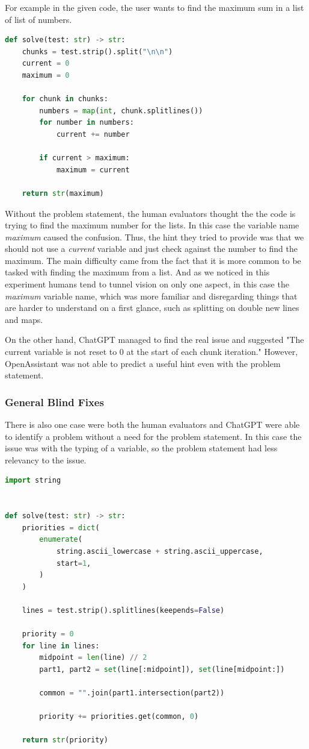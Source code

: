 \documentclass[12pt,a4paper]{report}
\begin{document}
For example in the given code, the user wants to find the maximum sum in a list of list of numbers.

\begin{lstlisting}[language=Python]
def solve(test: str) -> str:
    chunks = test.strip().split("\n\n")
    current = 0
    maximum = 0

    for chunk in chunks:
        numbers = map(int, chunk.splitlines())
        for number in numbers:
            current += number

        if current > maximum:
            maximum = current

    return str(maximum)
\end{lstlisting}

Without the problem statement, the human evaluators thought the the code is trying to find the maximum number for the lists. In this case the variable name \textit{maximum} caused the confusion. Thus, the hint they tried to provide was that we should not use a \textit{current} variable and just check against the number to find the maximum. The main difficulty came from the fact that it is more common to be tasked with finding the maximum from a list. And as we noticed in this experiment humans tend to tunnel vision on only one aspect, in this case the \textit{maximum} variable name, which was more familiar and disregarding things that are harder to understand on a first glance, such as splitting on double new lines and maps.

On the other hand, ChatGPT managed to find the real issue and suggested "The current variable is not reset to 0 at the start of each chunk iteration." However, OpenAssistant was not able to predict a useful hint even with the problem statement.

\subsubsection{General Blind Fixes}

There is also one case were both the human evaluators and ChatGPT were able to identify a problem without a need for the problem statement. In this case the issue was with the typing of a variable, so the problem statement had less relevancy to the issue.

\begin{lstlisting}[language=Python]
import string


def solve(test: str) -> str:
    priorities = dict(
        enumerate(
            string.ascii_lowercase + string.ascii_uppercase, 
            start=1,
        )
    )

    lines = test.strip().splitlines(keepends=False)

    priority = 0
    for line in lines:
        midpoint = len(line) // 2
        part1, part2 = set(line[:midpoint]), set(line[midpoint:])

        common = "".join(part1.intersection(part2))

        priority += priorities.get(common, 0)

    return str(priority)
\end{lstlisting}
\end{document}
